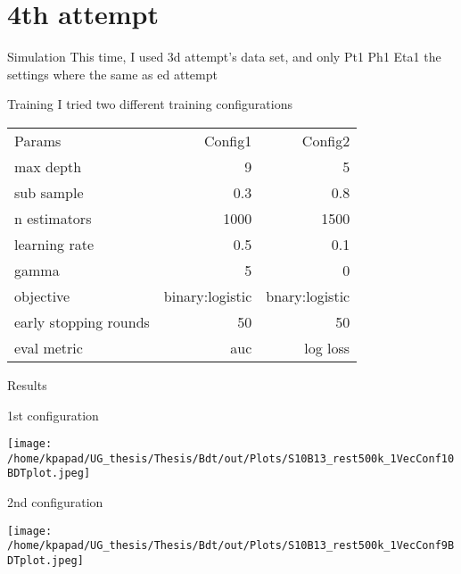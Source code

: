 \documentclass[bigger]{beamer}
\begin{document}
\section{4th attempt}
\label{sec:orgecb1362}
\begin{frame}[label={sec:orgaf56bde}]{Simulation}
This time, I used 3d attempt's data set, and only Pt1 Ph1 Eta1
the settings where the same as ed attempt
\end{frame}
\begin{frame}[label={sec:org44f5b9d}]{Training}
I tried two different training configurations 
\begin{center}
\begin{tabular}{lrr}
\alert{Params} & \alert{Config1} & \alert{Config2}\\
max depth & 9 & 5\\
sub sample & 0.3 & 0.8\\
n estimators & 1000 & 1500\\
learning rate & 0.5 & 0.1\\
gamma & 5 & 0\\
objective & binary:logistic & bnary:logistic\\
early stopping rounds & 50 & 50\\
eval metric & auc & log loss\\
\end{tabular}
\end{center}
\end{frame}
\begin{frame}[label={sec:orgea4b512}]{Results}
\end{frame}
\begin{frame}[label={sec:org212b6ac}]{1st configuration}
\begin{center}
\texttt{[image: /home/kpapad/UG\_thesis/Thesis/Bdt/out/Plots/S10B13\_rest500k\_1VecConf10BDTplot.jpeg]}
\end{center}
\end{frame}

\begin{frame}[label={sec:org1d7b1ea}]{2nd configuration}
\begin{center}
\texttt{[image: /home/kpapad/UG\_thesis/Thesis/Bdt/out/Plots/S10B13\_rest500k\_1VecConf9BDTplot.jpeg]}
\end{center}
\end{frame}
\end{document}
